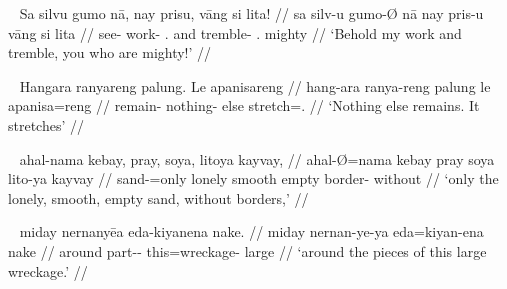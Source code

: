 \ex~\begingl
	\gla Sa silvu gumo nā, nay prisu, vāng si lita! //
	\glb sa silv-u gumo-Ø nā nay pris-u vāng si lita //
	\glc \PatT{} see-\Imp{} work-\Top{} \Fsg{}.\Gen{} and tremble-\Imp{}
		\Second{}.\Aarg{} \Rel{} mighty //
	\glft `Behold my work and tremble, you who are mighty!' //
\endgl\xe

\ex~\begingl
	\gla Hangara ranyareng palung. Le apanisareng //
	\glb hang-ara ranya-reng palung le apanisa=reng //
	\glc remain-\TsgI{} nothing-\AargI{} else \PatTI{} 
		stretch=\TsgI{}.\Aarg{} //
	\glft `Nothing else remains. It stretches' //
\endgl\xe

\ex~\begingl
	\gla ahal-nama kebay, pray, soya, litoya kayvay, //
	\glb ahal-Ø=nama kebay pray soya lito-ya kayvay //
	\glc sand-\Top{}=only lonely smooth empty border-\Top{} without //
	\glft `only the lonely, smooth, empty sand, without borders,' //
\endgl\xe

\ex~\begingl
	\gla miday nernanyēa eda-kiyanena nake. //
	\glb miday nernan-ye-ya eda=kiyan-ena nake //
	\glc around part-\Pl{}-\Loc{} this=wreckage-\Gen{} large //
	\glft `around the pieces of this large wreckage.' //
\endgl\xe
